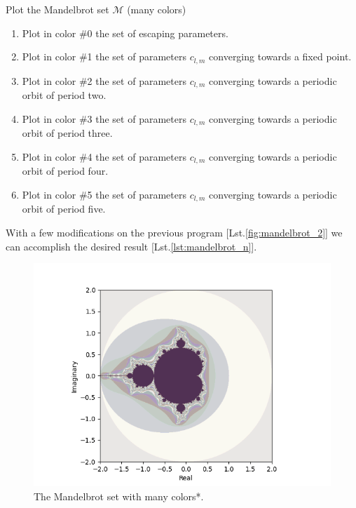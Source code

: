 \documentclass[11pt]{article}
\begin{document}
\pagebreak
\hypertarget{3}{%
\section{}\label{3}} Plot the Mandelbrot set $\mathcal{M}$ (many colors)
\begin{enumerate}[label=(\alph{*})]
    \item Plot in color \#0 the set of escaping parameters.
    \item Plot in color \#1 the set of parameters $c_{l,m}$ converging towards a fixed point.
    \item Plot in color \#2 the set of parameters $c_{l,m}$ converging towards a periodic orbit of period two.
    \item Plot in color \#3 the set of parameters $c_{l,m}$ converging towards a periodic orbit of period three.
    \item Plot in color \#4 the set of parameters $c_{l,m}$ converging towards a periodic orbit of period four.
    \item Plot in color \#5 the set of parameters $c_{l,m}$ converging towards a periodic orbit of period five.
\end{enumerate}

With a few modifications on the previous program [Lst.\ref{fig:mandelbrot_2}] we can accomplish the desired result [Lst.\ref{lst:mandelbrot_n}].


\begin{figure}[ht]
    \centering
    \includegraphics{mandelbrot_n.png}
    \caption{The Mandelbrot set with many colors*.}
    \label{fig:mandelbrot_n}
\end{figure}
\end{document}
